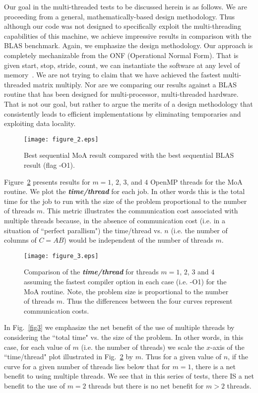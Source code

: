 \documentclass[aps,prl,twocolumn,groupedaddress,floatfix]{revtex4}
\begin{document}
Our goal in the multi-threaded tests to be discussed herein is as follows.
We are proceeding from a general, mathematically-based design methodology.  
Thus although our code was not designed to specifically exploit the 
multi-threading capabilities of this machine, we achieve impressive results
in comparison with the BLAS benchmark.  Again, we emphasize the design
methodology. Our approach is completely mechanizable from the ONF (Operational
Normal Form). That is given start, stop, stride, count, we can
instantiate the software at any 
level of memory~\cite{rmhr,mullin-raynolds-book,Mul03,mul91,cpc}.  We are not trying to claim that we have achieved the fastest
multi-threaded matrix multiply.  Nor are we comparing our results against
a BLAS routine that has been designed for multi-processor, multi-threaded
hardware.  That is not our goal, but rather to argue the merits of a
design methodology that consistently leads to efficient implementations 
by eliminating temporaries and exploiting data locality.

\begin{figure} 
\texttt{[image: figure\_2.eps]}\caption{
\label{fig1} 
Best sequential MoA result compared with the best
sequential BLAS result (flag -O1).}
\end{figure}

Figure~\ref{fig2} presents results for $m = 1$, $2$, $3$, and $4$ OpenMP
threads for the MoA routine.  We plot the {\bf \em time/thread} for 
each job.  In other words this is the total time for the job to
run with the size of the problem proportional to the number of threads $m$.
This metric illustrates the communication cost associated with multiple 
threads because, in the absence of communication cost (i.e. in a situation
of ``perfect parallism") the time/thread vs. $n$ (i.e. the number of 
columns of $C = AB$) would be independent of the number of threads $m$.

\begin{figure} 
\texttt{[image: figure\_3.eps]}\caption{
\label{fig2} 
Comparison of the {\bf \em time/thread} for 
threads $m = 1$, $2$, $3$ and $4$ assuming the fastest compiler option in 
each case (i.e. -O1) for the MoA routine.  
Note, the problem size is proportional to the number of threads $m$.  Thus 
the differences between the four curves represent communication costs.}
\end{figure}

In Fig.~\ref{fig3} we emphasize the net benefit of the use of multiple threads
by considering the ``total time" vs. the size of the problem.  In other 
words, in this case, for each value of $m$ (i.e. the number of threads) 
we scale the $x$-axis of the ``time/thread" plot illustrated in 
Fig.~\ref{fig2} by $m$.  
Thus for a given value of $n$, if the curve for a given number of threads
lies below that for $m = 1$, there is a net benefit to using multiple
threads.  We see that in this series of tests, there IS a net benefit to 
the use of $m = 2$ threads but there is no net benefit for $m > 2$ threads.
\end{document}
